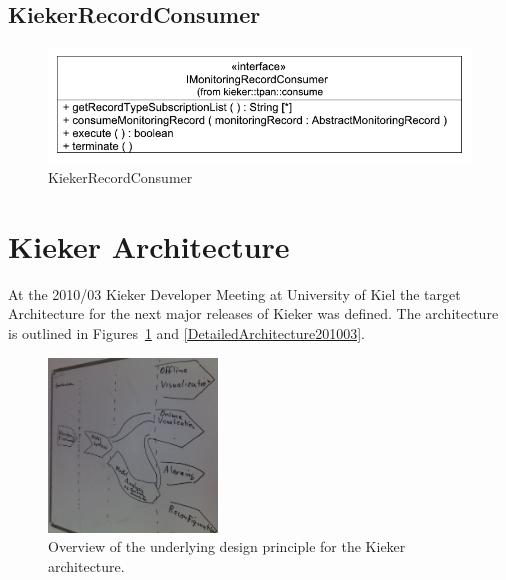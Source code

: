 \documentclass[12pt,journal,a4paper,twocolumn,final,oneside]{IEEEtran}%
\begin{document}
\subsection{KiekerRecordConsumer}

\begin{figure}[h]\centering
\includegraphics[scale=0.55]{figures/model/kieker_RecordConsumer}%
\caption{KiekerRecordConsumer}
\end{figure}

\clearpage

\appendix

\section{Kieker Architecture}

At the 2010/03 Kieker Developer Meeting at University of Kiel the target Architecture for the next major releases of Kieker was defined. The architecture is outlined in Figures~\ref{OverviewArchitecture201003} and \ref{DetailedArchitecture201003}.

\begin{figure}
 \centering
 \includegraphics[width=0.4\textwidth]{./figures/2010-03-09-TargetArchitectureOverview.jpg}
 \caption{Overview of the underlying design principle for the Kieker architecture.}\label{OverviewArchitecture201003}
\end{figure}
\end{document}
